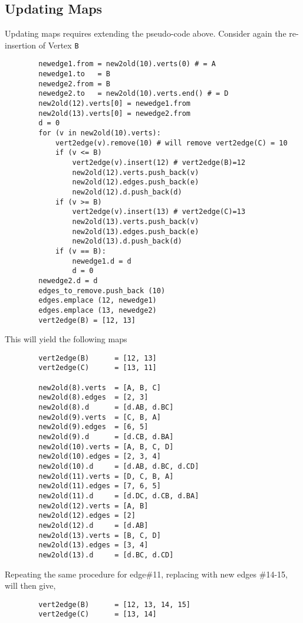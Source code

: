 \begin{spacing}{1.5}
    \vspace{12pt}\subsection{Updating Maps}

    \noindent Updating maps requires extending the pseudo-code above. Consider again the re-insertion of Vertex {\tt B}
    \begin{lstlisting}
        newedge1.from = new2old(10).verts(0) # = A
        newedge1.to   = B
        newedge2.from = B
        newedge2.to   = new2old(10).verts.end() # = D
        new2old(12).verts[0] = newedge1.from
        new2old(13).verts[0] = newedge2.from
        d = 0
        for (v in new2old(10).verts):
            vert2edge(v).remove(10) # will remove vert2edge(C) = 10
            if (v <= B)
                vert2edge(v).insert(12) # vert2edge(B)=12
                new2old(12).verts.push_back(v)
                new2old(12).edges.push_back(e)
                new2old(12).d.push_back(d)
            if (v >= B)
                vert2edge(v).insert(13) # vert2edge(C)=13
                new2old(13).verts.push_back(v)
                new2old(13).edges.push_back(e)
                new2old(13).d.push_back(d)
            if (v == B):
                newedge1.d = d
                d = 0
        newedge2.d = d
        edges_to_remove.push_back (10)
        edges.emplace (12, newedge1)
        edges.emplace (13, newedge2)
        vert2edge(B) = [12, 13]
    \end{lstlisting}
    This will yield the following maps
    \begin{lstlisting}
        vert2edge(B)      = [12, 13]
        vert2edge(C)      = [13, 11]

        new2old(8).verts  = [A, B, C]
        new2old(8).edges  = [2, 3]
        new2old(8).d      = [d.AB, d.BC]
        new2old(9).verts  = [C, B, A]
        new2old(9).edges  = [6, 5]
        new2old(9).d      = [d.CB, d.BA]
        new2old(10).verts = [A, B, C, D]
        new2old(10).edges = [2, 3, 4]
        new2old(10).d     = [d.AB, d.BC, d.CD]
        new2old(11).verts = [D, C, B, A]
        new2old(11).edges = [7, 6, 5]
        new2old(11).d     = [d.DC, d.CB, d.BA]
        new2old(12).verts = [A, B]
        new2old(12).edges = [2]
        new2old(12).d     = [d.AB]
        new2old(13).verts = [B, C, D]
        new2old(13).edges = [3, 4]
        new2old(13).d     = [d.BC, d.CD]
    \end{lstlisting}
    Repeating the same procedure for edge\#11, replacing with new edges \#14-15, will then give,
    \begin{lstlisting}
        vert2edge(B)      = [12, 13, 14, 15]
        vert2edge(C)      = [13, 14]


\end{lstlisting}
\end{spacing}
